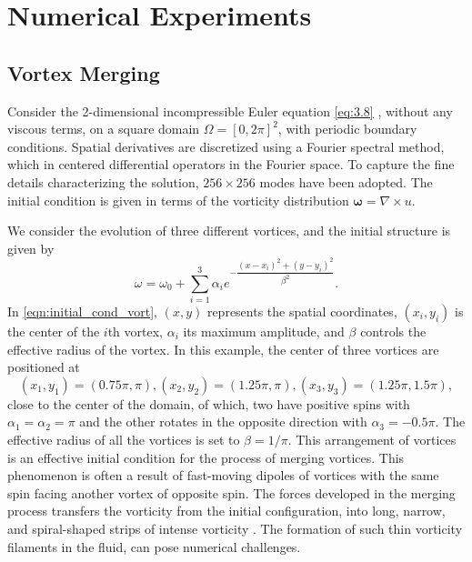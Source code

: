 

\section{Numerical Experiments} \label{sec:res}

\subsection{Vortex Merging} \label{sec:res.1}
Consider the 2-dimensional incompressible Euler equation \eqref{eq:3.8} , without any viscous terms, on a square domain $\Omega = [0,2\pi]^2$, with periodic boundary conditions. Spatial derivatives are discretized using a Fourier spectral method, which in centered differential operators in the Fourier space. To capture the fine details characterizing the solution, $256\times 256$ modes have been adopted. The initial condition is given in terms of the vorticity distribution $\mathbf{\omega} = \nabla \times u$. 

We consider the evolution of three different vortices, and the initial structure is given by
\begin{equation}\label{eqn:initial_cond_vort}
\omega = \omega_0 + \sum_{i=1}^{3} \alpha_i e^{-\dfrac{\left(x-x_i\right)^{2}+\left(y-y_i\right)^{2}}{\beta^2}}.
\end{equation}
In \eqref{eqn:initial_cond_vort}, $(x,y)$ represents the spatial coordinates, $\left( x_i, y_i\right)$ is the center of the $i$th vortex, $\alpha_i$ its maximum amplitude, and $\beta$ controls the effective radius of the vortex. In this example, the center of three vortices are positioned at 
\begin{equation}
\left( x_1, y_1 \right) = \left(0.75\pi,\pi\right) , \left( x_2, y_2 \right) = \left(1.25\pi,\pi\right), \left( x_3, y_3 \right) = \left(1.25\pi,1.5\pi\right),
\end{equation}
close to the center of the domain, of which, two have positive spins with $\alpha_1 = \alpha_2 = \pi$ and the other rotates in the opposite direction with $\alpha_3 = -0.5\pi$. The effective radius of all the vortices is set to $\beta = 1 / \pi$. This arrangement of vortices is an effective initial condition for the process of merging vortices. This phenomenon is often a result of fast-moving dipoles of vortices with the same spin facing another vortex \cite{filaments_vort2} of opposite spin. The forces developed in the merging process transfers the vorticity from the initial configuration, into long, narrow, and spiral-shaped strips of intense vorticity \cite{filaments_vort}. The formation of such thin vorticity filaments in the fluid, can pose numerical challenges. 

